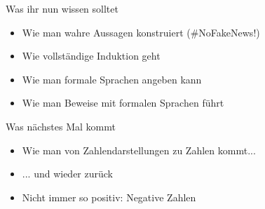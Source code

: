 \begin{frame}	
	\begin{block}{Was ihr nun wissen solltet}
		\begin{itemize}
			\item Wie man wahre Aussagen konstruiert \qquad (\#NoFakeNews!) 
			\item Wie vollständige Induktion geht
			\item Wie man formale Sprachen angeben kann
			\item Wie man Beweise mit formalen Sprachen führt
		\end{itemize}
	\end{block}
	
	\begin{block}{Was nächstes Mal kommt}
		\begin{itemize}
			\item Wie man von Zahlendarstellungen zu Zahlen kommt...
			\item[] ... und wieder zurück
			\item Nicht immer so positiv: Negative Zahlen
		\end{itemize}
	\end{block}
\end{frame}

\slideThanks


